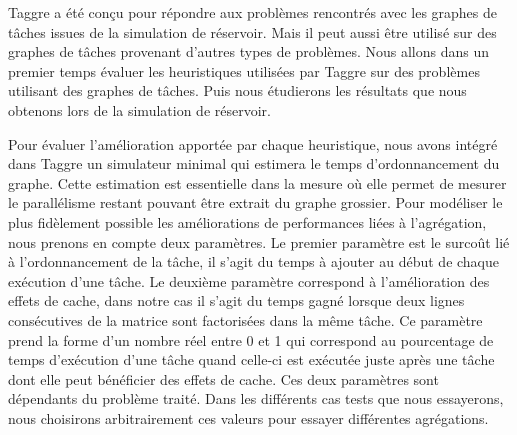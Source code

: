 Taggre a été conçu pour répondre aux problèmes rencontrés avec les graphes de tâches issues de la simulation de réservoir.
%
Mais il peut aussi être utilisé sur des graphes de tâches provenant d'autres types de problèmes.
%
Nous allons dans un premier temps évaluer les heuristiques utilisées par Taggre sur des problèmes utilisant des graphes de tâches.
%
Puis nous étudierons les résultats que nous obtenons lors de la simulation de réservoir.


Pour évaluer l'amélioration apportée par chaque heuristique, nous avons intégré dans Taggre un simulateur minimal qui estimera le temps d'ordonnancement du graphe.
%
Cette estimation est essentielle dans la mesure où elle permet de mesurer le parallélisme restant pouvant être extrait du graphe grossier.
%
Pour modéliser le plus fidèlement possible les améliorations de performances liées à l'agrégation, nous prenons en compte deux paramètres.
%
Le premier paramètre est le surcoût lié à l'ordonnancement de la tâche, il s'agit du temps à ajouter au début de chaque exécution d'une tâche.
%
Le deuxième paramètre correspond à l'amélioration des effets de cache, dans notre cas il s'agit du temps gagné lorsque deux lignes consécutives de la matrice sont factorisées dans la même tâche.
%
Ce paramètre prend la forme d'un nombre réel entre 0 et 1 qui correspond au pourcentage de temps d'exécution d'une tâche quand celle-ci est exécutée juste après une tâche dont elle peut bénéficier des effets de cache.
%
Ces deux paramètres sont dépendants du problème traité.
%
Dans les différents cas tests que nous essayerons, nous choisirons arbitrairement ces valeurs pour essayer différentes agrégations.
